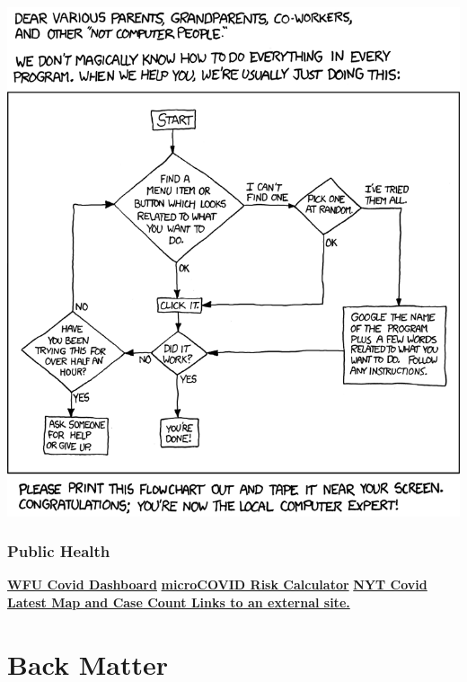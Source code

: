 \includegraphics[width=10.17in]{img/tech_support_cheat_sheet}

\hypertarget{public-health}{%
\section{Public Health}\label{public-health}}

\textbf{\href{https://ourwayforward.wfu.edu/covid-19-dashboard/}{WFU Covid Dashboard}}
\textbf{\href{https://www.microcovid.org/}{microCOVID Risk Calculator}}
\textbf{\href{https://www.nytimes.com/interactive/2021/us/north-carolina-covid-cases.html}{NYT Covid Latest Map and Case Count Links to an external site.}}

\hypertarget{part-back-matter}{%
\part*{Back Matter}\label{part-back-matter}}



\label{app:bibliography} %

\manualmark
\markboth{\spacedlowsmallcaps{\bibname}}{\spacedlowsmallcaps{\bibname}}





%




